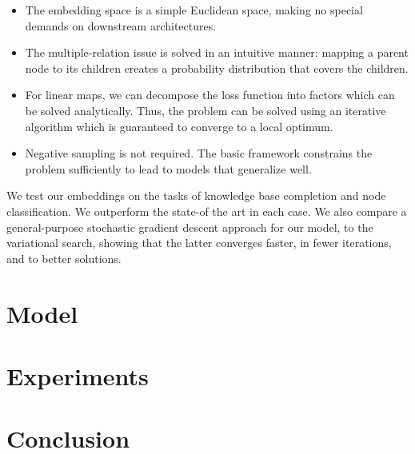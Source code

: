 \documentclass[11pt]{article}
\begin{document}
	\begin{itemize}
		\item The embedding space is a simple Euclidean space, making no special demands on downstream architectures.
		\item The multiple-relation issue is solved in an intuitive manner: mapping a parent node to its children creates a probability distribution that covers the children. 
		\item For linear maps, we can decompose the loss function into factors which can be solved analytically. Thus, the problem can be solved using an iterative algorithm which is guaranteed to converge to a local optimum.
		\item Negative sampling is not required. The basic framework constrains the problem sufficiently to lead to models that generalize well.
	\end{itemize}

	We test our embeddings on the tasks of knowledge base completion and node classification. We outperform the state-of the art in each case. We also compare a general-purpose stochastic gradient descent approach for our model, to the variational search, showing that the latter converges faster, in fewer iterations, and to better solutions.
	
\section{Model}

\section{Experiments}

\section{Conclusion}



\end{document}
